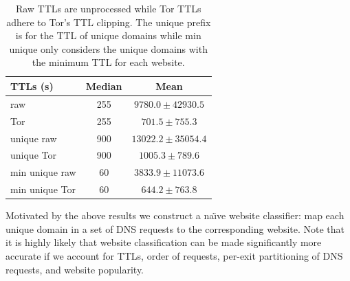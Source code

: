 \begin{table}[t]
	\caption{Raw TTLs are unprocessed while Tor TTLs adhere to Tor's TTL clipping.
	The unique prefix is for the TTL of unique domains while min unique only
	considers the unique domains with the minimum TTL for each website.}
	\centering
	\begin{tabular}{l c c}
	\toprule
	\textbf{TTLs (s)} & \textbf{Median} & \textbf{Mean} \\
	\midrule
	raw & 255 & $9780.0\pm42930.5$ \\ %
	Tor & 255 & $701.5\pm755.3$ \\ %
	unique raw & 900 & $13022.2\pm35054.4$ \\ %
	unique Tor & 900 & $1005.3\pm789.6$ \\ %
	min unique raw & 60 & $3833.9\pm11073.6$ \\ %
	min unique Tor & 60 & $644.2\pm763.8$ \\ %
	\bottomrule
	\end{tabular}
	\label{tab:ttls}
\end{table}


Motivated by the above results we construct a na\"{\i}ve website classifier:
map each unique domain in a set of DNS requests to the corresponding website.
Note that it is highly likely that website classification can be made
significantly more accurate if we account for TTLs, order of requests, per-exit
partitioning of DNS requests, and website popularity.

